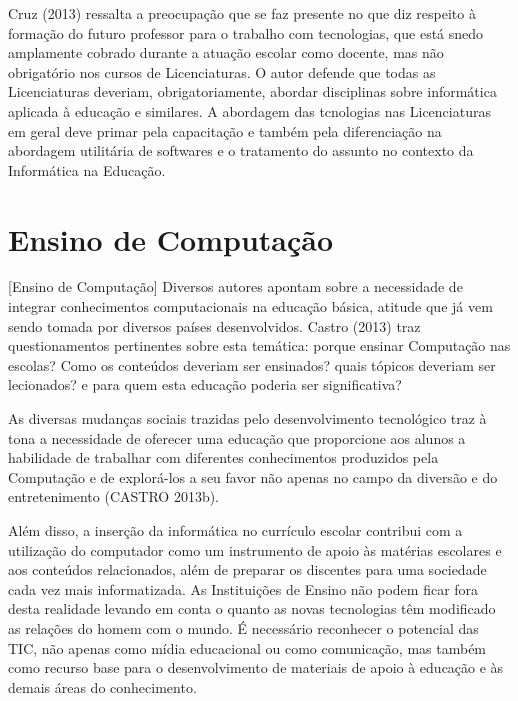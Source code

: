     
	Cruz (2013) ressalta a preocupação que se faz presente no que diz respeito à formação do futuro professor para o trabalho com tecnologias, que está snedo amplamente cobrado durante a atuação escolar como docente, mas não obrigatório nos cursos de Licenciaturas. O autor defende que todas as Licenciaturas deveriam, obrigatoriamente, abordar disciplinas sobre informática aplicada à educação e similares. A abordagem das tcnologias nas Licenciaturas em geral deve primar pela capacitação e também pela diferenciação na abordagem utilitária de softwares e o tratamento do assunto no contexto da Informática na Educação.
    
    
\section{Ensino de Computação}%
 
[Ensino de Computação]
	Diversos autores apontam sobre a necessidade de integrar conhecimentos computacionais na educação básica, atitude que já vem sendo tomada por diversos países desenvolvidos. Castro (2013) traz questionamentos pertinentes sobre esta temática: porque ensinar Computação nas escolas? Como os conteúdos deveriam ser ensinados? quais tópicos deveriam ser lecionados? e para quem esta educação poderia ser significativa?
    
    
	As diversas mudanças sociais trazidas pelo desenvolvimento tecnológico traz à tona a necessidade de oferecer uma educação que proporcione aos alunos a habilidade de trabalhar com diferentes conhecimentos produzidos pela Computação e de explorá-los a seu favor não apenas no campo da diversão e do entretenimento (CASTRO 2013b).
    
    
	Além disso, a inserção da informática no currículo escolar contribui com a utilização do computador como um instrumento de apoio às matérias escolares e aos conteúdos relacionados, além de preparar os discentes para uma sociedade cada vez mais informatizada. As Instituições de Ensino não podem ficar fora desta realidade levando em conta o quanto as novas tecnologias têm modificado as relações do homem com o mundo. É necessário reconhecer o potencial das TIC, não apenas como mídia educacional ou como comunicação, mas também como recurso base para o desenvolvimento de materiais de apoio à educação e às demais áreas do conhecimento.	
 

